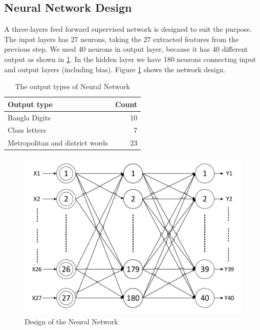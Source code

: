 \documentclass{standalone}
\begin{document}
\subsection{Neural Network Design}
A three-layers feed forward supervised network is designed to suit the purpose. The input layers has 27 neurons, taking the 27 extracted features from the previous step. We used 40 neurons in output layer, because it has 40 different output as shown in \ref{table:OutputTypes}. In the hidden layer we have 180 neurons connecting input and output layers (including bias). Figure \ref{fig:PerceptronModel} shows the network design.

\begin{table}[hb]
\centering
\caption{The output types of Neural Network}
\label{table:OutputTypes}
\begin{tabular}{|l|r|}
\hline
Output type & Count  \\
\hline
Bangla Digits   & 10 \\
Class letters   & 7  \\
Metropolitan and district words  & 23 \\
\hline
\end{tabular}
\end{table}

\begin{figure}[hb]
     \centering
     \includegraphics[width=1.0\linewidth]{./img/plots/neural}
     \caption{Design of the Neural Network}
     \label{fig:PerceptronModel}
\end{figure}
\end{document}
